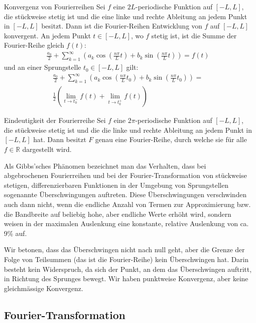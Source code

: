 \documentclass[a4paper,10pt]{article}
\begin{document}
\begin{subbox}{Konvergenz von Fourierreihen}
  Sei \(f\) eine \(2L\)-periodische Funktion auf \([-L,L]\), die stückweise stetig ist und die eine linke und rechte Ableitung an jedem Punkt in \([-L,L]\) besitzt. Dann ist die Fourier-Reihen Entwicklung von \(f\) auf \([-L,L]\) konvergent. An jedem Punkt \(t\in[-L,L]\), wo \(f\) stetig ist, ist die Summe der Fourier-Reihe gleich \(f(t)\):
   \begin{align*} \frac{a_0}{2}+\sum_{k=1}^\infty\left(a_k\cos\left(\frac{n\pi}{L}t\right)+b_k\sin\left(\frac{n\pi}{L}t\right)\right)=f(t) \end{align*}
    und an einer Sprungstelle \(t_0\in[-L,L]\) gilt:
     \begin{align*} \frac{a_0}{2}+\sum_{k=1}^\infty\left(a_k\cos\left(\frac{n\pi}{L}t_0\right)+b_k\sin\left(\frac{n\pi}{L}t_0\right)\right)=\\\frac12\left(\lim_{t\to t_0^-}f(t)+\lim_{t\to t_0^+}f(t)\right) \end{align*}
\end{subbox}

\begin{subbox}{Eindeutigkeit der Fourierreihe}
  Sei \(f\) eine \(2\pi\)-periodische Funktion auf \([-L,L]\), die stückweise stetig ist und die die linke und rechte Ableitung an jedem Punkt in \([-L,L]\) hat. Dann besitzt \(F\) genau eine Fourier-Reihe, durch welche sie für alle \(f\in\mathbb{R}\) dargestellt wird.
\end{subbox}

Als Gibbs'sches Phänomen bezeichnet man das Verhalten, dass bei abgebrochenen Fourierreihen und bei der Fourier-Transformation von stückweise stetigen, differenzierbaren Funktionen in der Umgebung von Sprungstellen sogenannte Überschwingungen auftreten. Diese Überschwingungen verschwinden auch dann nicht, wenn die endliche Anzahl von Termen zur Approximierung bzw. die Bandbreite auf beliebig hohe, aber endliche Werte erhöht wird, sondern weisen in der maximalen Auslenkung eine konstante, relative Auslenkung von ca. 9\% auf.

Wir betonen, dass das Überschwingen nicht nach null geht, aber die Grenze der Folge von Teilsummen (das ist die Fourier-Reihe) kein Überschwingen hat. Darin besteht kein Widerspruch, da sich der Punkt, an dem das Überschwingen auftritt, in Richtung des Sprunges bewegt. Wir haben punktweise Konvergenz, aber keine gleichmässige Konvergenz.

\subsection{Fourier-Transformation}
\end{document}
